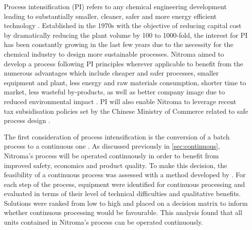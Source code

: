 Process intensification (PI) refers to any chemical engineering development leading to substantially smaller, cleaner, safer and more energy efficient technology \cite{reay_chapter_2008}. Established in the 1970s with the objective of reducing capital cost by dramatically reducing the plant volume by 100 to 1000-fold, the interest for PI has been constantly growing in the last few years due to the necessity for the chemical industry to design more sustainable processes. Nitroma aimed to develop a process following PI principles wherever applicable to benefit from the numerous advantages which include cheaper and safer processes, smaller equipment and plant, less energy and raw materials consumption, shorter time to market, less wasteful by-products, as well as better company image due to reduced environmental impact \cite{reay_chapter_2008}. PI will also enable Nitroma to leverage recent tax subsidisation policies set by the Chinese Ministry of Commerce related to safe process design \cite{nanjing_economic_and_technological_development_zone_administration_committee_public_2019}.  

The first consideration of process intensification is the conversion of a batch process to a continuous one \cite{randall_process_2020}. As discussed previously in \cref{sec:continuous}, Nitroma's process will be operated continuously in order to benefit from improved safety, economics and product quality. To make this decision, the feasibility of a continuous process was assessed with a method developed by \textcite{teoh_practical_2016}. For each step of the process, equipment were  identified for continuous processing and evaluated in terms of their level of technical difficulties and qualitative benefits. Solutions were ranked from low to high and placed on a decision matrix to inform whether continuous processing would be favourable. This analysis found that all units contained in Nitroma's process can be operated continuously.

